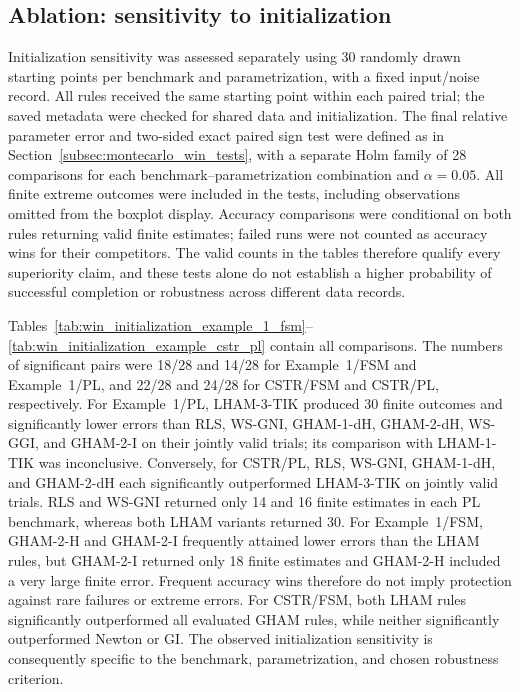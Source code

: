 \subsection{Ablation: sensitivity to initialization}
\label{subsec:initialization_win_tests}
Initialization sensitivity was assessed separately using 30 randomly drawn
starting points per benchmark and parametrization, with a fixed input/noise
record. All rules received the same starting point within each paired trial;
the saved metadata were checked for shared data and initialization.
The final relative parameter error and two-sided exact paired sign test
were defined as in Section~\ref{subsec:montecarlo_win_tests}, with a separate
Holm family of 28 comparisons for each benchmark--parametrization combination
and $\alpha=0.05$. All finite extreme outcomes were included in the tests,
including observations omitted from the boxplot display.
Accuracy comparisons were conditional on both rules returning valid finite
estimates; failed runs were not counted as accuracy wins for their competitors.
The valid counts in the tables therefore qualify every superiority claim,
and these tests alone do not establish a higher probability of successful
completion or robustness across different data records.

Tables~\ref{tab:win_initialization_example_1_fsm}--\ref{tab:win_initialization_example_cstr_pl}
contain all comparisons. The numbers of significant pairs were 18/28 and
14/28 for Example~1/FSM and Example~1/PL, and 22/28 and 24/28 for CSTR/FSM
and CSTR/PL, respectively. For Example~1/PL, LHAM-3-TIK produced 30 finite
outcomes and significantly lower errors than RLS, WS-GNI, GHAM-1-dH,
GHAM-2-dH, WS-GGI, and GHAM-2-I on their jointly valid trials; its comparison
with LHAM-1-TIK was inconclusive. Conversely, for CSTR/PL, RLS, WS-GNI,
GHAM-1-dH, and GHAM-2-dH each significantly outperformed LHAM-3-TIK on
jointly valid trials. RLS and WS-GNI returned only 14 and 16 finite estimates
in each PL benchmark, whereas both LHAM variants returned 30.
For Example~1/FSM, GHAM-2-H and GHAM-2-I frequently attained lower errors
than the LHAM rules, but GHAM-2-I returned only 18 finite estimates and
GHAM-2-H included a very large finite error. Frequent accuracy wins therefore
do not imply protection against rare failures or extreme errors.
For CSTR/FSM, both LHAM rules significantly outperformed all evaluated GHAM
rules, while neither significantly outperformed Newton or GI.
The observed initialization sensitivity is consequently specific to the
benchmark, parametrization, and chosen robustness criterion.

